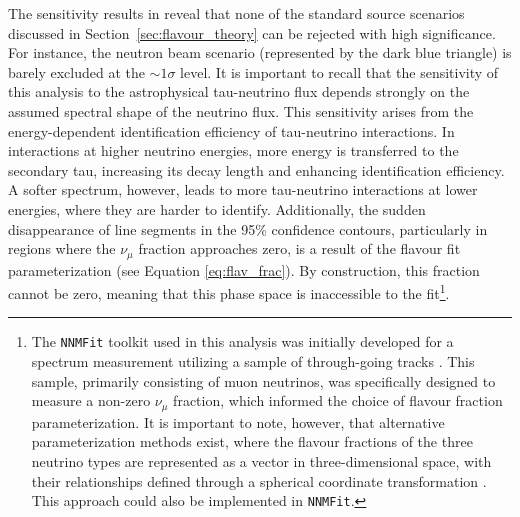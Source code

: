The sensitivity results in  reveal that none of the standard source scenarios discussed in Section~\ref{sec:flavour_theory} can be rejected with high significance. For instance, the neutron beam scenario (represented by the dark blue triangle) is barely excluded at the $\sim1\sigma$ level. It is important to recall that the sensitivity of this analysis to the astrophysical tau-neutrino flux depends strongly on the assumed spectral shape of the neutrino flux. This sensitivity arises from the energy-dependent identification efficiency of tau-neutrino interactions. In interactions at higher neutrino energies, more energy is transferred to the secondary tau, increasing its decay length and enhancing identification efficiency. A softer spectrum, however, leads to more tau-neutrino interactions at lower energies, where they are harder to identify. Additionally, the sudden disappearance of line segments in the 95\% confidence contours, particularly in regions where the $\nu_\mu$ fraction approaches zero, is a result of the flavour fit parameterization (see Equation \ref{eq:flav_frac}). By construction, this fraction cannot be zero, meaning that this phase space is inaccessible to the fit\footnote{The \texttt{NNMFit} toolkit used in this analysis was initially developed for a spectrum measurement utilizing a sample of through-going tracks \cite{diffusenumu}. This sample, primarily consisting of muon neutrinos, was specifically designed to measure a non-zero \(\nu_{\mu}\) fraction, which informed the choice of flavour fraction parameterization. It is important to note, however, that alternative parameterization methods exist, where the flavour fractions of the three neutrino types are represented as a vector in three-dimensional space, with their relationships defined through a spherical coordinate transformation \cite{golemflavour}. This approach could also be implemented in \texttt{NNMFit}.}.

